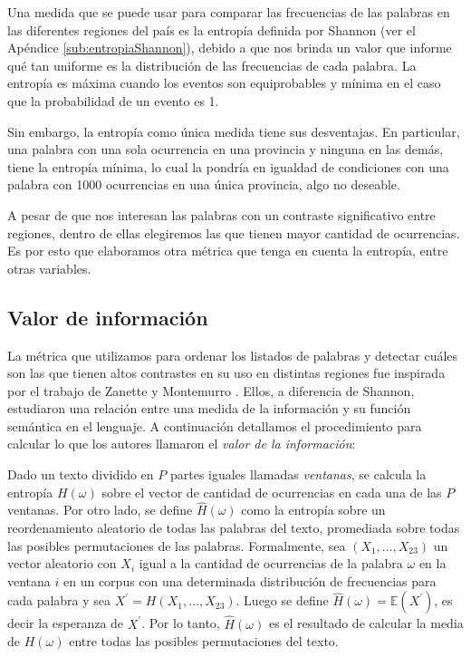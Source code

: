 Una medida que se puede usar para comparar las frecuencias de las palabras en las diferentes regiones del país es la entropía definida por Shannon (ver el Apéndice \ref{sub:entropiaShannon}), debido a que nos brinda un valor que informe qué tan uniforme es la distribución de las frecuencias de cada palabra. La entropía es máxima cuando los eventos son equiprobables y mínima en el caso que la probabilidad de un evento es 1.

Sin embargo, la entropía como única medida tiene sus desventajas. En particular, una palabra con una sola ocurrencia en una provincia y ninguna en las demás, tiene la entropía mínima, lo cual la pondría en igualdad de condiciones con una palabra con 1000 ocurrencias en una única provincia, algo no deseable.

A pesar de que nos interesan las palabras con un contraste significativo entre regiones, dentro de ellas elegiremos las que tienen mayor cantidad de ocurrencias. Es por esto que elaboramos otra métrica que tenga en cuenta la entropía, entre otras variables.


\subsection{Valor de información}
La métrica que utilizamos para ordenar los listados de palabras y detectar cuáles son
las que tienen altos contrastes en su uso en distintas regiones fue inspirada por el
trabajo de Zanette y Montemurro \cite{montemurro2010towards}.
Ellos, a diferencia de Shannon, estudiaron una relación entre una medida de la información y su función semántica en el lenguaje.
A continuación detallamos el procedimiento para calcular lo que los autores llamaron
el \textit{valor de la información}:

Dado un texto dividido en $P$ partes iguales llamadas \textit{ventanas}, se calcula la entropía  $H(\omega)$ sobre el vector de cantidad de ocurrencias en cada una de las $P$ ventanas.
Por otro lado, se define $\widehat{H}(\omega)$ como la entropía sobre un reordenamiento aleatorio de todas las palabras del texto, promediada sobre todas las posibles permutaciones de las palabras. Formalmente, sea $(X_{1},\dots,X_{23})$ un vector aleatorio con $X_{i}$ igual a la cantidad de ocurrencias de la palabra $\omega$ en la ventana $i$ en un corpus con una determinada distribución de frecuencias para cada palabra y sea $X^\prime = H(X_1,\dots,X_{23})$. Luego se define $\widehat{H}(\omega) = \mathbb{E}(X^\prime)$, es decir la esperanza de $X^\prime$. Por lo tanto, $\widehat{H}(\omega)$ es el resultado de calcular la media de $H(\omega)$ entre todas las posibles permutaciones del texto.


